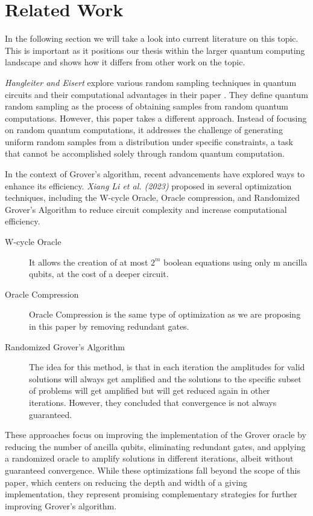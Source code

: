 \section{Related Work}
In the following section we will take a look into current literature on this topic.
This is important as it positions our thesis within the larger quantum computing landscape and shows how it differs from other work on the topic.



\textit{Hangleiter and Eisert} explore various random sampling techniques in quantum circuits and their computational advantages in their paper \cite{Hangleiter_2023}. 
They define quantum random sampling as the process of obtaining samples from random quantum computations. 
However, this paper takes a different approach. 
Instead of focusing on random quantum computations, it addresses the challenge of generating uniform random samples from a distribution under specific constraints, a task that cannot be accomplished solely through random quantum computation.

In the context of Grover's algorithm, recent advancements have explored ways to enhance its efficiency. \textit{Xiang Li et al. (2023)} proposed in \cite{li2023resource} several optimization techniques, including the W-cycle Oracle, Oracle compression, and Randomized Grover's Algorithm to reduce circuit complexity and increase computational efficiency.
\begin{description}
    \item[W-cycle Oracle]
    It allows the creation of at most $2^m$ boolean equations using only m ancilla qubits, at the cost of a deeper circuit.
    \item[Oracle Compression]
    Oracle Compression is the same type of optimization as we are proposing in this paper by removing redundant gates.
    \item[Randomized Grover's Algorithm]
    The idea for this method, is that in each iteration the amplitudes for valid solutions will always get amplified and the solutions to the specific subset of problems will get amplified but will get reduced again in other iterations.
    However, they concluded that convergence is not always guaranteed.
\end{description}
These approaches focus on improving the implementation of the Grover oracle by reducing the number of ancilla qubits, eliminating redundant gates, and applying a randomized oracle to amplify solutions in different iterations, albeit without guaranteed convergence. 
While these optimizations fall beyond the scope of this paper, which centers on reducing the depth and width of a giving implementation, they represent promising complementary strategies for further improving Grover's algorithm.